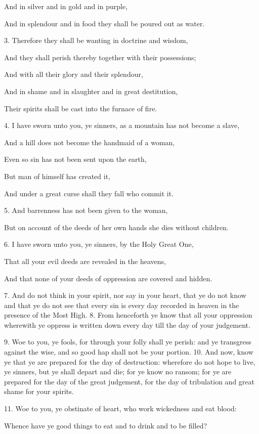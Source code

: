 And in silver and in gold and in purple,

And in splendour and in food they shall be poured out as water.

3. Therefore they shall be wanting in doctrine and wisdom,

And they shall perish thereby together with their possessions;

And with all their glory and their splendour,

And in shame and in slaughter and in great destitution,

Their spirits shall be cast into the furnace of fire.

4. I have sworn unto you, ye sinners, as a mountain has not become a slave,

And a hill does not become the handmaid of a woman,

Even so sin has not been sent upon the earth,

But man of himself has created it,

And under a great curse shall they fall who commit it.

5. And barrenness has not been given to the woman,

But on account of the deeds of her own hands she dies without children.

6. I have sworn unto you, ye sinners, by the Holy Great One,

That all your evil deeds are revealed in the heavens,

And that none of your deeds of oppression are covered and hidden.

7. And do not think in your spirit, nor say in your
heart, that ye do not know and that ye do not see
that every sin is every day recorded in heaven in the
presence of the Most High. 8. From henceforth ye
know that all your oppression wherewith ye oppress is
written down every day till the day of your judgement.

9. Woe to you, ye fools, for through your folly shall
ye perish: and ye transgress against the wise, and so
good hap shall not be your portion. 10. And now,
know ye that ye are prepared for the day of destruction:
wherefore do not hope to live, ye sinners, but
ye shall depart and die; for ye know no ransom;
for ye are prepared for the day of the great judgement,
for the day of tribulation and great shame for your
spirits.

11. Woe to you, ye obstinate of heart, who work wickedness and eat blood:

Whence have ye good things to eat and to drink and to be filled?

